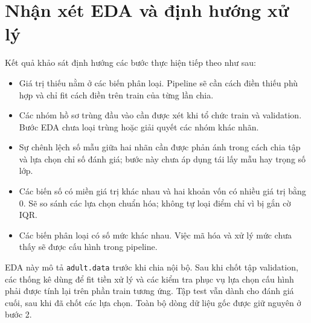 \section{Nhận xét EDA và định hướng xử lý}
\label{sec:3_7}
Kết quả khảo sát định hướng các bước thực hiện tiếp theo như sau:
\begin{itemize}
  \item Giá trị thiếu nằm ở các biến phân loại. Pipeline sẽ cần cách điền thiếu phù hợp và chỉ fit cách điền trên train của từng lần chia.
  \item Các nhóm hồ sơ trùng đầu vào cần được xét khi tổ chức train và validation. Bước EDA chưa loại trùng hoặc giải quyết các nhóm khác nhãn.
  \item Sự chênh lệch số mẫu giữa hai nhãn cần được phản ánh trong cách chia tập và lựa chọn chỉ số đánh giá; bước này chưa áp dụng tái lấy mẫu hay trọng số lớp.
  \item Các biến số có miền giá trị khác nhau và hai khoản vốn có nhiều giá trị bằng 0. Sẽ so sánh các lựa chọn chuẩn hóa; không tự loại điểm chỉ vì bị gắn cờ IQR.
  \item Các biến phân loại có số mức khác nhau. Việc mã hóa và xử lý mức chưa thấy sẽ được cấu hình trong pipeline.
\end{itemize}

EDA này mô tả \texttt{adult.data} trước khi chia nội bộ. Sau khi chốt tập validation, các thống kê dùng để fit tiền xử lý và các kiểm tra phục vụ lựa chọn cấu hình phải được tính lại trên phần train tương ứng. Tập test vẫn dành cho đánh giá cuối, sau khi đã chốt các lựa chọn. Toàn bộ dòng dữ liệu gốc được giữ nguyên ở bước 2.
